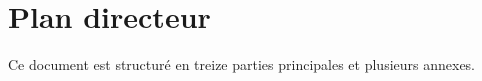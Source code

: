\chapter*{Plan directeur}

Ce document est structuré en treize parties principales et plusieurs annexes.

